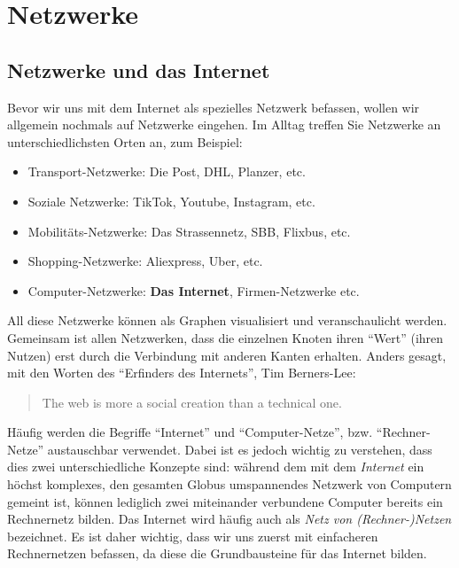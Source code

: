 \chapter{Netzwerke}

\section{Netzwerke und das Internet}
Bevor wir uns mit dem Internet als spezielles Netzwerk befassen, wollen wir allgemein nochmals auf Netzwerke eingehen. Im Alltag treffen Sie Netzwerke an unterschiedlichsten Orten an, zum Beispiel:
\begin{itemize}
	\item Transport-Netzwerke: Die Post, DHL, Planzer, etc.
	\item Soziale Netzwerke: TikTok, Youtube, Instagram, etc.
	\item Mobilitäts-Netzwerke: Das Strassennetz, SBB, Flixbus, etc.
	\item Shopping-Netzwerke: Aliexpress, Uber, etc.
	\item Computer-Netzwerke: \textbf{Das Internet}, Firmen-Netzwerke etc.
\end{itemize}

All diese Netzwerke können als Graphen visualisiert und veranschaulicht werden. Gemeinsam ist allen Netzwerken, dass die einzelnen Knoten ihren \enquote{Wert} (ihren Nutzen) erst durch die Verbindung mit anderen Kanten erhalten. Anders gesagt, mit den Worten des \enquote{Erfinders des Internets}, Tim Berners-Lee:

\begin{quotation}
	The web is more a social creation than a technical one.
\end{quotation}

Häufig werden die Begriffe ``Internet'' und ``Computer-Netze'', bzw. ``Rechner-Netze'' austauschbar verwendet. Dabei ist es jedoch wichtig zu verstehen, dass dies zwei unterschiedliche Konzepte sind: während dem mit dem \textit{Internet} ein höchst komplexes, den gesamten Globus umspannendes Netzwerk von Computern gemeint ist, können lediglich zwei miteinander verbundene Computer bereits ein Rechnernetz bilden. Das Internet wird häufig auch als \textit{Netz von (Rechner-)Netzen} bezeichnet. Es ist daher wichtig, dass wir uns zuerst mit einfacheren Rechnernetzen befassen, da diese die Grundbausteine für das Internet bilden.

